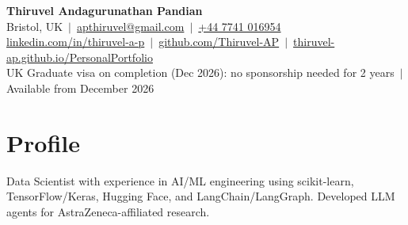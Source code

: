 \documentclass[a4paper,10pt]{article}
\begin{document}
\fontsize{10.5}{12.6}\selectfont

\begin{center}
  {\LARGE\bfseries Thiruvel Andagurunathan Pandian}\\[3pt]
  Bristol, UK \,$|$\, \href{mailto:apthiruvel@gmail.com}{apthiruvel@gmail.com} \,$|$\, \href{tel:+447741016954}{+44 7741 016954}\\[1pt]
\href{https://www.linkedin.com/in/thiruvel-a-p/}{linkedin.com/in/thiruvel-a-p} \,$|$\, \href{https://github.com/Thiruvel-AP}{github.com/Thiruvel-AP} \,$|$\, \href{https://thiruvel-ap.github.io/PersonalPortfolio/}{thiruvel-ap.github.io/PersonalPortfolio}\\[1pt]
  UK Graduate visa on completion (Dec 2026): no sponsorship needed for 2 years \,$|$\, Available from December 2026
\end{center}

\section{Profile}
Data Scientist with experience in AI/ML engineering using scikit-learn, TensorFlow/Keras, Hugging Face, and LangChain/LangGraph. Developed LLM agents for AstraZeneca-affiliated research.

\end{document}
